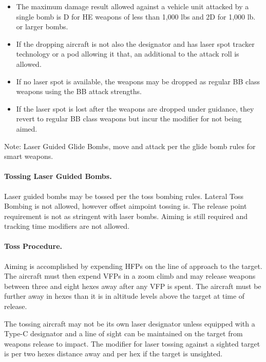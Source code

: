 \begin{itemize}

    \item The maximum damage result allowed against a vehicle unit attacked by a single bomb is D for HE weapons of less than 1,000 lbs and 2D for 1,000 lb. or larger bombs.

    \item If the dropping aircraft is not also the designator and has laser spot tracker technology or a pod allowing it that, an additional  to the attack roll is allowed.

    \item If no laser spot is available, the weapons may be dropped as regular BB class weapons using the BB attack strengths.

    \item If the laser spot is lost after the weapons are dropped under guidance, they revert to regular BB class weapons but incur the  modifier for not being aimed.

\end{itemize}

Note: Laser Guided Glide Bombs, move and attack per the glide bomb rules for smart weapons.

\paragraph{Tossing Laser Guided Bombs.} Laser guided bombs may be tossed per the toss bombing rules. Lateral Toss Bombing is not allowed, however offset aimpoint tossing is. The release point requirement is not as stringent with laser bombs. Aiming is still required and tracking time modifiers are not allowed.

\paragraph{Toss Procedure.} Aiming is accomplished by expending HFPs on the line of approach to the target. The aircraft must then expend VFPs in a zoom climb and may release weapons between three and eight hexes away after any VFP is spent. The aircraft must be further away in hexes than it is in altitude levels above the target at time of release.

The tossing aircraft may not be its own laser designator unless equipped with a Type-C designator and a line of sight can be maintained on the target from weapons release to impact. The modifier for laser tossing against a sighted target is  per two hexes distance away and  per hex if the target is unsighted.

